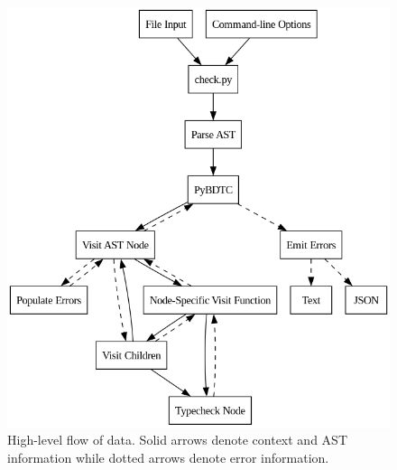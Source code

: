 \documentclass[10pt,twocolumn]{article}
\begin{document}
\begin{figure}
    \centering
    \includegraphics[width=.95\linewidth]{arch.png}
    \caption{
        High-level flow of data. Solid arrows denote context and AST information while dotted arrows denote error information.
    }
    \label{fig:architecture}
\end{figure}
\printbibliography
\end{document}
